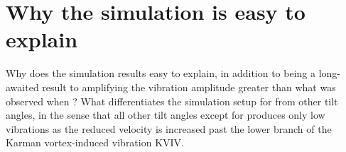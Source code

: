 \documentclass[a4paper]{article}
\begin{document}
\section*{Why the \rze{} simulation is easy to explain}
Why does the \rze{} simulation results easy to explain, in addition to being a long-awaited result to amplifying the vibration amplitude greater than what was observed when \rfo{}? What differentiates the simulation setup for \rze{} from other tilt angles, in the sense that all other tilt angles except for \rfo{} produces only low vibrations as the reduced velocity \ured{} is increased past the lower branch of the Karman vortex-induced vibration KVIV.
\end{document}

